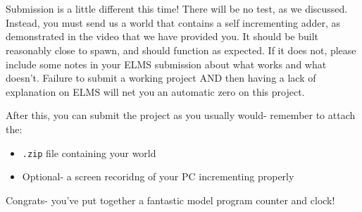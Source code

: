 \documentclass{article}
\begin{document}
\section{\selectfont{Testing \& Submission}}

Submission is a little different this time!
There will be no test, as we discussed.
Instead, you must send us a world that contains a self incrementing adder, as demonstrated in the video that we have provided you.
It should be built reasonably close to spawn, and should function as expected.
If it does not, please include some notes in your ELMS submission about what works and what doesn't.
Failure to submit a working project AND then having a lack of explanation on ELMS will net you an automatic zero on this project.

After this, you can submit the project as you usually would- remember to attach the:

\begin{itemize}
  \item \texttt{.zip} file containing your world
  \item Optional- a screen recoridng of your PC incrementing properly
\end{itemize}

Congrats- you've put together a fantastic model program counter and clock!
\end{document}
